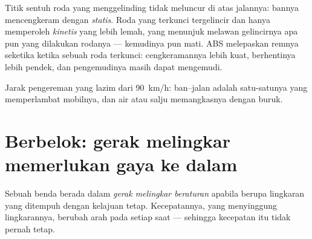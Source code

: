 \begin{remark}\label{rem:g11:forces-and-motion:abs}
Titik sentuh roda yang menggelinding tidak meluncur di atas jalannya:
bannya mencengkeram dengan  \emph{statis}. Roda yang terkunci
tergelincir dan hanya memperoleh  \emph{kinetis} yang lebih
lemah, yang menunjuk melawan gelincirnya apa pun yang dilakukan
rodanya --- kemudinya pun mati. ABS melepaskan remnya seketika ketika
sebuah roda terkunci: cengkeramannya lebih kuat, berhentinya lebih
pendek, dan pengemudinya masih dapat mengemudi.
\end{remark}

\begin{omfigure}

{\small Jarak pengereman yang lazim dari \qty{90}{km/h}: 
ban--jalan adalah satu-satunya  yang memperlambat mobilnya, dan air
atau salju memangkasnya dengan buruk.}
\end{omfigure}

\section{Berbelok: gerak melingkar memerlukan gaya ke dalam}

\begin{definition}\label{def:g11:forces-and-motion:ucm}
Sebuah benda berada dalam \emph{gerak melingkar
beraturan} apabila  berupa
lingkaran yang ditempuh dengan kelajuan tetap. Kecepatannya, yang
menyinggung lingkarannya, berubah arah pada setiap saat --- sehingga
kecepatan itu tidak pernah tetap.
\end{definition}

